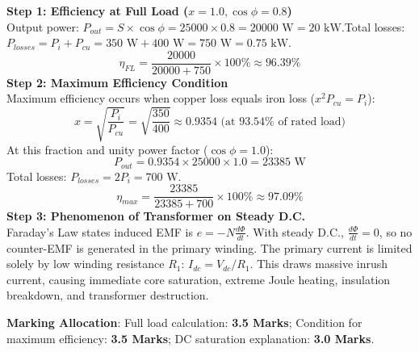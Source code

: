 \begin{solbox}
\textbf{Step 1: Efficiency at Full Load ($x = 1.0, \cos\phi = 0.8$)}\\Output power: $P_{out} = S \times \cos\phi = 25000 \times 0.8 = 20000\text{ W} = 20\text{ kW}$.Total losses: $P_{losses} = P_i + P_{cu} = 350\text{ W} + 400\text{ W} = 750\text{ W} = 0.75\text{ kW}$.\[ \eta_{FL} = \frac{20000}{20000 + 750} \times 100\% \approx 96.39\% \]\textbf{Step 2: Maximum Efficiency Condition}\\Maximum efficiency occurs when copper loss equals iron loss ($x^2 P_{cu} = P_i$):\[ x = \sqrt{\frac{P_i}{P_{cu}}} = \sqrt{\frac{350}{400}} \approx 0.9354 \text{ (at } 93.54\% \text{ of rated load)} \]At this fraction and unity power factor ($\cos\phi = 1.0$):\[ P_{out} = 0.9354 \times 25000 \times 1.0 = 23385\text{ W} \]Total losses: $P_{losses} = 2 P_i = 700\text{ W}$.\[ \eta_{max} = \frac{23385}{23385 + 700} \times 100\% \approx 97.09\% \]\textbf{Step 3: Phenomenon of Transformer on Steady D.C.}\\Faraday's Law states induced EMF is $e = -N \frac{d\Phi}{dt}$. With steady D.C., $\frac{d\Phi}{dt} = 0$, so no counter-EMF is generated in the primary winding. The primary current is limited solely by low winding resistance $R_1$: $I_{dc} = V_{dc}/R_1$. This draws massive inrush current, causing immediate core saturation, extreme Joule heating, insulation breakdown, and transformer destruction.
\end{solbox}

\begin{examinertip}
\textbf{Marking Allocation}: Full load calculation: \textbf{3.5 Marks}; Condition for maximum efficiency: \textbf{3.5 Marks}; DC saturation explanation: \textbf{3.0 Marks}.
\end{examinertip}
\vspace{4mm}
